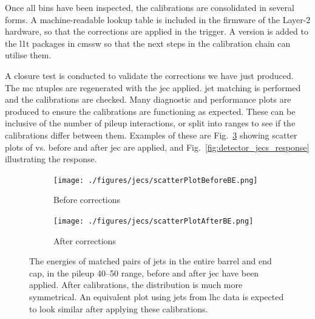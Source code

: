 Once all \abseta bins have been inspected, the calibrations are consolidated in several forms. A machine-readable lookup table is included in the firmware of the Layer-2 hardware, so that the corrections are applied in the trigger. A version is added to the \acrlong{l1t} packages in \acrshort{cmssw} so that the next steps in the calibration chain can utilise them.

A closure test is conducted to validate the corrections we have just produced. The \acrshort{mc} ntuples are regenerated with the \acrshort{jec} applied. \Gls{jet} matching is performed and the calibrations are checked. Many diagnostic and performance plots are produced to ensure the calibrations are functioning as expected. These can be inclusive of the number of \gls{pileup} interactions, or split into ranges to see if the calibrations differ between them. Examples of these are Fig.~\ref{fig:detector_jecs_scatter_BE} showing scatter plots of \ptRef vs. \ptLOne before and after \acrshort{jec} are applied, and Fig.~\ref{fig:detector_jecs_response} illustrating the response.

\begin{figure}[htbp]
    \centering
    \begin{subfigure}[b]{0.45\textwidth}
        \texttt{[image: ./figures/jecs/scatterPlotBeforeBE.png]}
        \caption{Before corrections}
        \label{fig:detector_jecs_scatter_before_BE}
    \end{subfigure}
    \hfill
    \begin{subfigure}[b]{0.45\textwidth}
        \texttt{[image: ./figures/jecs/scatterPlotAfterBE.png]}
        \caption{After corrections}
        \label{fig:detector_jecs_scatter_after_BE}
    \end{subfigure}
\caption[The energies of matched pairs of jets in the entire barrel and end cap, in the pileup 40--50 range, before and after jet energy corrections have been applied]{The energies of matched pairs of \glspl{jet} in the entire barrel and end cap, in the \gls{pileup} 40--50 range, before and after \acrlong{jec} have been applied. After calibrations, the distribution is much more symmetrical. An equivalent plot using \glspl{jet} from \acrshort{lhc} data is expected to look similar after applying these calibrations.}
\label{fig:detector_jecs_scatter_BE}
\end{figure}

